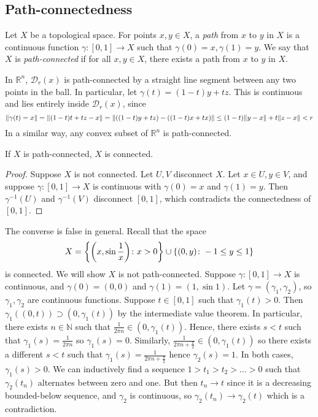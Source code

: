 \subsection{Path-connectedness}
\begin{definition}
	Let \( X \) be a topological space.
	For points \( x, y \in X \), a \textit{path} from \( x \) to \( y \) in \( X \) is a continuous function \( \gamma \colon [0,1] \to X \) such that \( \gamma(0) = x, \gamma(1) = y \).
	We say that \( X \) is \textit{path-connected} if for all \( x, y \in X \), there exists a path from \( x \) to \( y \) in \( X \).
\end{definition}
\begin{example}
	In \( \mathbb R^n \), \( \mathcal D_r(x) \) is path-connected by a straight line segment between any two points in the ball.
	In particular, let \( \gamma(t) = (1-t)y + tz \).
	This is continuous and lies entirely inside \( \mathcal D_r(x) \), since
	\[
		\norm{\gamma(t) = x} = \norm{(1-t)t + tz - x} = \norm{((1-t)y+tz)-((1-t)x+tx)} \leq (1-t)\norm{y-x} + t\norm{z-x} < r
	\]
	In a similar way, any convex subset of \( \mathbb R^n \) is path-connected.
\end{example}
\begin{theorem}
	If \( X \) is path-connected, \( X \) is connected.
\end{theorem}
\begin{proof}
	Suppose \( X \) is not connected.
	Let \( U, V \) disconnect \( X \).
	Let \( x \in U, y \in V \), and suppose \( \gamma \colon [0,1] \to X \) is continuous with \( \gamma(0) = x \) and \( \gamma(1) = y \).
	Then \( \gamma^{-1}(U) \) and \( \gamma^{-1}(V) \) disconnect \( [0,1] \), which contradicts the connectedness of \( [0,1] \).
\end{proof}
\begin{example}
	The converse is false in general.
	Recall that the space
	\[
		X = \qty{\qty(x, \sin \frac{1}{x}) \colon x > 0} \cup \qty{(0,y) \colon -1 \leq y \leq 1}
	\]
	is connected.
	We will show \( X \) is not path-connected.
	Suppose \( \gamma \colon [0,1] \to X \) is continuous, and \( \gamma(0) = (0,0) \) and \( \gamma(1) = (1, \sin 1) \).
	Let \( \gamma = (\gamma_1, \gamma_2) \), so \( \gamma_1, \gamma_2 \) are continuous functions.
	Suppose \( t \in [0,1] \) such that \( \gamma_1(t) > 0 \).
	Then \( \gamma_1((0,t)) \supset (0, \gamma_1(t)) \) by the intermediate value theorem.
	In particular, there exists \( n \in \mathbb N \) such that \( \frac{1}{2\pi n} \in (0, \gamma_1(t)) \).
	Hence, there exists \( s < t \) such that \( \gamma_1(s) = \frac{1}{2\pi n} \) so \( \gamma_1(s) = 0 \).
	Similarly, \( \frac{1}{2\pi n + \frac{\pi}{2}} \in (0, \gamma_1(t)) \) so there exists a different \( s < t \) such that \( \gamma_1(s) = \frac{1}{2\pi n + \frac{\pi}{2}} \) hence \( \gamma_2(s) = 1 \).
	In both cases, \( \gamma_1(s) > 0 \).
	We can inductively find a sequence \( 1 > t_1 > t_2 > \dots > 0 \) such that \( \gamma_2(t_n) \) alternates between zero and one.
	But then \( t_n \to t \) since it is a decreasing bounded-below sequence, and \( \gamma_2 \) is continuous, so \( \gamma_2(t_n) \to \gamma_2(t) \) which is a contradiction.
\end{example}

